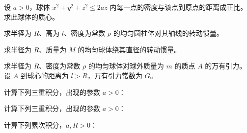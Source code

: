 \noindent\begin{minipage}{\textwidth}
设 $a>0$，球体 $x^2+y^2+z^2\le2az$ 内每一点的密度与该点到原点的距离成正比。求此球体的质心。
\end{minipage}\par\vfill
\noindent\begin{minipage}{\textwidth}
求半径为 $R$、高为 $l$、密度为常数 $\rho$ 的均匀圆柱体对其轴线的转动惯量。
\end{minipage}\par\vfill
\noindent\begin{minipage}{\textwidth}
求半径为 $R$、质量为 $M$ 的均匀球体绕其直径的转动惯量。
\end{minipage}\par\vfill
\newpage
\noindent\begin{minipage}{\textwidth}
求半径为 $R$、密度为常数 $\rho$ 的均匀球体对球外质量为 $m$ 的质点 $A$ 的万有引力。设 $A$ 到球心的距离为 $l>R$，万有引力常数为 $G$。
\end{minipage}\par\vfill
\noindent\begin{minipage}{\textwidth}
计算下列三重积分，出现的参数 $a>0$：
\end{minipage}\par\vfill
\noindent\begin{minipage}{\textwidth}
计算下列三重积分，出现的参数 $a>0$：
\end{minipage}\par\vfill
\noindent\begin{minipage}{\textwidth}
计算下列累次积分，$a,R>0$：
\end{minipage}\par\vfill
\newpage
